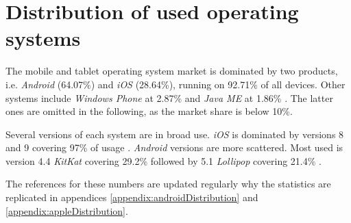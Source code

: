 \section{Distribution of used operating systems}\label{preStudy:devices}

The mobile and tablet operating system market is dominated by two products, i.e. \textit{Android} (64.07\%) and \textit{iOS} (28.64\%), running on 92.71\% of all devices.
Other systems include \textit{Windows Phone} at 2.87\% and \textit{Java ME} at 1.86\% \citep{preStudy:devices:companies}.
The latter ones are omitted in the following, as the market share is below 10\%.

Several versions of each system are in broad use.
\textit{iOS} is dominated by versions 8 and 9 covering 97\% of usage \citep{preStudy:devices:apple}.
\textit{Android} versions are more scattered. 
Most used is version 4.4 \textit{KitKat} covering 29.2\% followed by 5.1 \textit{Lollipop} covering 21.4\% \citep{preStudy:devices:android}.

The references for these numbers are updated regularly why the statistics are replicated in appendices \ref{appendix:androidDistribution} and \ref{appendix:appleDistribution}.

